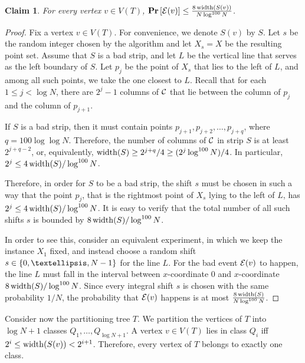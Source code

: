 \documentclass[11pt]{article}
\numberwithin{equation}{section}
\newtheorem{claim}[theorem]{Claim}
\theoremstyle{definition}
\theoremstyle{plain}
\begin{document}
%
	
%
%

\begin{claim}\label{claim: prob bad strip}
For every vertex $v\in V(T)$, $\text{\bf Pr}\left [{\cal{E}}(v)\right]\leq \frac{8\operatorname{width}(S(v))}{N\log^{100} N}$.
\end{claim}

\begin{proof}
	Fix a vertex $v\in V(T)$.
	For convenience, we denote $S(v)$ by $S$. Let $s$ be the random integer chosen by the algorithm and let $X_s=X$ be the resulting point set.
	Assume that $S$ is a bad strip, and let $L$ be the vertical line that serves as the left boundary of $S$. Let $p_j$ be the point of $X_s$ that lies to the left of $L$, and among all such points, we take the one closest to $L$. Recall that for each $1\leq j< \log N$, there are $2^j-1$ columns of ${\mathcal C}$ that lie between the column of $p_j$ and the column of $p_{j+1}$. %
	
	If $S$ is a bad strip, then it must contain points $p_{j+1},p_{j+2},\ldots,p_{j+q}$, where $q= 100\log\log N$. Therefore, the number of columns of ${\mathcal C}$ in strip $S$ is at least $2^{j+q-2}$, or, equivalently, $\operatorname{width}(S)\geq 2^{j+q}/4\geq (2^j\log^{100}N)/4$. In particular, $2^j\leq 4\operatorname{width}(S)/\log^{100}N$. 
	
	Therefore, in order for $S$ to be a bad strip, the shift $s$ must be chosen in such a way that the point $p_j$, that is the rightmost point of $X_s$ lying to the left of $L$, has $2^j\leq 4\operatorname{width}(S)/\log^{100}N$. It is easy to verify that the total number of all such shifts $s$ is bounded by $8\operatorname{width}(S)/\log^{100}N$.
	
	In order to see this, consider an equivalent experiment, in which we keep the instance $X_1$ fixed, and instead choose a random shift $s\in \set{0,\ldots,N-1}$ for the line $L$. For the bad event ${\cal{E}}(v)$ to happen, the line $L$ must fall in the interval between $x$-coordinate $0$ and $x$-coordinate $8\operatorname{width}(S)/\log^{100}N$. Since every integral shift $s$ is chosen with the same probability $1/N$, the probability that ${\cal{E}}(v)$ happens is at most $\frac{8\operatorname{width}(S)}{N\log^{100} N}$.
\end{proof}


Consider now the partitioning tree $T$. We partition the vertices of $T$ into $\log N+1$ classes $Q_1,\ldots,Q_{\log N+1}$. A vertex $v\in V(T)$ lies in class $Q_i$ iff $2^i\leq \operatorname{width}(S(v))< 2^{i+1}$. Therefore, every vertex of $T$ belongs to exactly one class.
\end{document}
